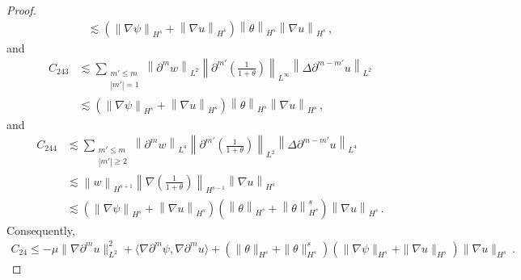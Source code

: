 \documentclass[10pt,a4paper]{amsart}
\begin{document}
\begin{proof}
\begin{equation*}
\begin{aligned}
\lesssim \left( \left\| \nabla \psi \right\|_{H^s} + \left\| \nabla u \right\|_{H^s} \right) \left\| \theta \right\|_{H^s} \left\| \nabla u \right\|_{H^s} \,,
\end{aligned}
\end{equation*}
and
\begin{equation*}
\begin{aligned}
C_{243}&\lesssim\sum_{\substack{m' \leq m \\ |m'|=1}} \left\| \partial^m w \right\|_{L^2} \left\| \partial^{m'} \left( \frac{1}{1+\theta} \right) \right\|_{L^\infty} \left\| \Delta \partial^{m-m'} u \right\|_{L^2} \\&
\lesssim \left( \left\| \nabla \psi \right\|_{H^s} + \left\| \nabla u \right\|_{H^s} \right) \left\| \theta \right\|_{H^s} \left\| \nabla u \right\|_{H^s} \,,
\end{aligned}
\end{equation*}
and
\begin{equation*}
\begin{aligned}
C_{244}&\lesssim \sum_{\substack{m' \leq m \\ |m'| \geq 2}} \left\| \partial^m w \right\|_{L^4} \left\| \partial^{m'} \left( \frac{1}{1+\theta} \right) \right\|_{L^2} \left\| \Delta \partial^{m-m'} u \right\|_{L^4} \\&
\lesssim \left\| w \right\|_{H^{s+1}} \left\| \nabla \left( \frac{1}{1+\theta} \right) \right\|_{H^{s-1}} \left\| \nabla u \right\|_{H^s} \\&
\lesssim \left( \left\| \nabla \psi \right\|_{H^s} + \left\| \nabla u \right\|_{H^s} \right) \left( \left\| \theta \right\|_{H^s} + \left\| \theta \right\|_{H^s}^s \right) \left\| \nabla u \right\|_{H^s} \,.
\end{aligned}
\end{equation*}
Consequently,
\begin{equation}\label{gpsi-eq18}
\begin{aligned}
C_{24} \leq -\mu \| \nabla \partial^m u \|_{L^2}^2 + \langle \nabla \partial^m \psi, \nabla \partial^m u \rangle + ( \|\theta\|_{H^s} + \|\theta\|_{H^s}^s ) ( \|\nabla \psi\|_{H^s} + \|\nabla u\|_{H^s} ) \| \nabla u \|_{H^s} \,.
\end{aligned}
\end{equation}


\end{proof}
\end{document}
